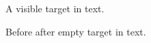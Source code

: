 \documentclass{article}
\begin{document}
A \hypertarget{a}{visible target} in text.

Before \hypertarget{b}{}after empty target in text.


\end{document}
